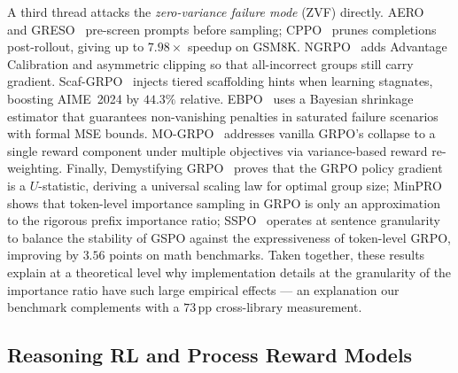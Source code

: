 A third thread attacks the \emph{zero-variance failure mode} (ZVF) directly.
AERO~\cite{zhang2026aero} and GRESO~\cite{zhang2026greso} pre-screen prompts
before sampling; CPPO~\cite{lin2025cppo} prunes completions post-rollout,
giving up to $7.98\times$ speedup on GSM8K. NGRPO~\cite{nan2025ngrpo} adds
Advantage Calibration and asymmetric clipping so that all-incorrect groups
still carry gradient. Scaf-GRPO~\cite{zhang2025scaffgrpo} injects tiered
scaffolding hints when learning stagnates, boosting AIME~2024 by $44.3\%$
relative. EBPO~\cite{han2026ebpo} uses a Bayesian shrinkage estimator that
guarantees non-vanishing penalties in saturated failure scenarios with formal
MSE bounds. MO-GRPO~\cite{ichihara2025mogrpo} addresses vanilla GRPO's
collapse to a single reward component under multiple objectives via
variance-based reward re-weighting. Finally, Demystifying
GRPO~\cite{zhou2026demystify} proves that the GRPO policy gradient is a
$U$-statistic, deriving a universal scaling law for optimal group size;
MinPRO~\cite{lei2026minpro} shows that token-level importance sampling in
GRPO is only an approximation to the rigorous prefix importance ratio;
SSPO~\cite{yang2025sspo} operates at sentence granularity to balance the
stability of GSPO against the expressiveness of token-level GRPO, improving
by $3.56$ points on math benchmarks. Taken together, these results explain at
a theoretical level why implementation details at the granularity of the
importance ratio have such large empirical effects --- an explanation our
benchmark complements with a $73\,\mathrm{pp}$ cross-library measurement.

\subsection{Reasoning RL and Process Reward Models}
\label{sec:related:reasoning}

